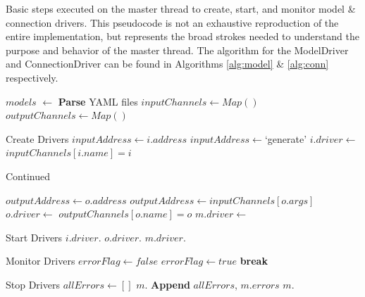 \documentclass[journal]{IEEEtran}
\begin{document}
\begin{appendices}
%
\begin{algorithm}[H]
	\caption{Basic steps executed on the master thread to create, start, and monitor model \& connection drivers. This pseudocode is not an exhaustive reproduction of the entire implementation, but represents the broad strokes needed to understand the purpose and behavior of the master thread. The algorithm for the {\sc ModelDriver} and {\sc ConnectionDriver} can be found in Algorithms \ref{alg:model} \& \ref{alg:conn} respectively.}
	\label{alg:master}
	\begin{algorithmic}[1]
	\State $models$ $\gets$ \textbf{Parse} YAML files
	\State $inputChannels \gets Map()$
	\State $outputChannels \gets Map()$
	\item[] \Comment Create Drivers
				\State $inputAddress \gets i.address$
			\Else
				\State $inputAddress \gets $`generate'
			\EndIf
			\State $i.driver \gets$ 
			\State $inputChannels[i.name] = i$
	\end{algorithmic}
\end{algorithm}
\addtocounter{algorithm}{-1}
\begin{algorithm}[H]
	\caption{Continued}
	\begin{algorithmic}[1]
		\EndFor
	\EndFor
				\State $outputAddress \gets o.address$
			\Else
					\State $outputAddress \gets inputChannels[o.args]$
				\Else
					\State {}
				\EndIf
			\EndIf
			\State $o.driver \gets$ 
			\State $outputChannels[o.name] = o$
		\EndFor
	\EndFor
		\State $m.driver \gets$ 
	\EndFor
	\item[] \Comment Start Drivers	
			\State $i.driver.$
		\EndFor
	\EndFor
			\State $o.driver.$
		\EndFor
	\EndFor
		\State $m.driver.$
	\EndFor
	\item[] \Comment Monitor Drivers
	\State $errorFlag \gets false$
				\State $errorFlag \gets true$
				\State \textbf{break}
			\EndIf
		\EndFor
	\EndWhile
	\item[] \Comment Stop Drivers
		\State $allErrors \gets []$
			\State $m.$
			\State \textbf{Append} $allErrors$, $m.errors$
		\EndFor
		\State {}
	\Else
			\State $m.$
		\EndFor
	\EndIf
	\end{algorithmic}
\end{algorithm}



\end{appendices}
\end{document}
